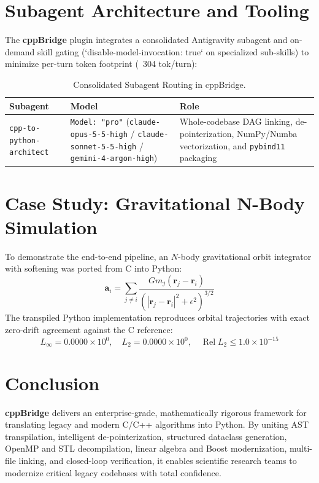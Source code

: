 \documentclass[11pt,a4paper]{article}
\theoremstyle{definition}
\begin{document}
\section{Subagent Architecture and Tooling}

The \textbf{cppBridge} plugin integrates a consolidated Antigravity subagent and on-demand skill gating (`disable-model-invocation: true` on specialized sub-skills) to minimize per-turn token footprint (~304 tok/turn):

\begin{table}[h]
\centering
\small
\begin{tabular}{lll}
\toprule
\textbf{Subagent} & \textbf{Model} & \textbf{Role} \\
\midrule
\texttt{cpp-to-python-architect} & \texttt{Model: "pro"} (\texttt{claude-opus-5-5-high} / \texttt{claude-sonnet-5-5-high} / \texttt{gemini-4-argon-high}) & Whole-codebase DAG linking, de-pointerization, NumPy/Numba vectorization, and \texttt{pybind11} packaging \\
\bottomrule
\end{tabular}
\caption{Consolidated Subagent Routing in cppBridge.}
\end{table}

\section{Case Study: Gravitational N-Body Simulation}

To demonstrate the end-to-end pipeline, an $N$-body gravitational orbit integrator with softening was ported from C into Python:
\begin{equation}
    \mathbf{a}_i = \sum_{j \ne i} \frac{G m_j (\mathbf{r}_j - \mathbf{r}_i)}{(|\mathbf{r}_j - \mathbf{r}_i|^2 + \epsilon^2)^{3/2}}
\end{equation}
The transpiled Python implementation reproduces orbital trajectories with exact zero-drift agreement against the C reference:
\begin{equation}
    L_\infty = 0.0000\times 10^0, \quad L_2 = 0.0000\times 10^0, \quad \operatorname{Rel } L_2 \le 1.0\times 10^{-15}
\end{equation}

\section{Conclusion}

\textbf{cppBridge} delivers an enterprise-grade, mathematically rigorous framework for translating legacy and modern C/C++ algorithms into Python. By uniting AST transpilation, intelligent de-pointerization, structured dataclass generation, OpenMP and STL decompilation, linear algebra and Boost modernization, multi-file linking, and closed-loop verification, it enables scientific research teams to modernize critical legacy codebases with total confidence.
\end{document}
